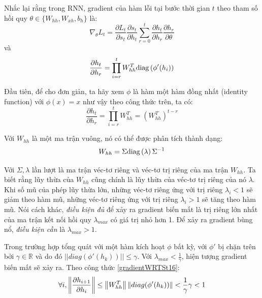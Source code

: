 Nhắc lại rằng trong RNN, gradient của hàm lỗi tại bước thời gian $t$ theo tham số hồi quy $\theta  \in \{W_{hh}, W_{xh}, b_h \}$ là:
\begin{equation} \label{beginGradientVanish0}
	\nabla_{\theta}L_t = \frac{\partial L_t}{\partial s_t} \frac{\partial s_t}{\partial h_t} \sum_{r=0}^{t}  \frac{\partial h_t}{\partial h_r}\frac{\partial h_r}{\partial \theta}
\end{equation}
và 
\begin{equation} \label{beginGradientVanish1}
	\frac{\partial h_t}{\partial h_r} = \prod_{i=r}^{t} W_{hh}^T \mathrm{diag} \left( \phi'(h_i) \right)
\end{equation}

Đầu tiên, để cho đơn giản, ta hãy xem $\phi$ là hàm một hàm đồng nhất (identity function) với $\phi(x) = x$ như vậy theo công thức trên, ta có:
\begin{equation} \label{gradientVanish3}
	\frac{\partial h_t}{\partial h_r} = \prod_{i=r}^{t} W_{hh}^T = \left (W_{hh}^T \right)^{t-r}
\end{equation}

Với $W_{hh}$ là một ma trận vuông, nó có thể được phân tích thành dạng:
\begin{equation} \label{gradientVanish4}
	W_{hh} = \Sigma \mathrm{diag} \left(\lambda \right) \Sigma^{-1} 
\end{equation}

Với $\Sigma, \lambda$ lần lượt là ma trận véc-tơ riêng và véc-tơ trị riêng của ma trận $W_{hh}$. Ta biết rằng lũy thừa của $W_{hh}$ cũng chính là lũy thừa của véc-tơ trị riêng của nó $\lambda$. Khi số mũ của phép lũy thừa lớn, những véc-tơ riêng ứng với trị riêng $\lambda_i < 1$ sẽ giảm theo hàm mũ, những véc-tơ riêng ứng với trị riêng $\lambda_i > 1$ sẽ tăng theo hàm mũ. Nói cách khác, \textit{điều kiện đủ} để xảy ra gradient biến mất là trị riêng lớn nhất của ma trận kết nối hồi quy $\lambda_{max}$ có giá trị nhỏ hơn 1. Để xảy ra gradient bùng nổ, \textit{điều kiện cần} là $\lambda_{max} > 1$.

Trong trường hợp tổng quát với một hàm kích hoạt $\phi$ bất kỳ, với $\phi'$ bị chặn trên bởi $\gamma \in \mathbb{R}$ và do đó $||diag(\phi'(h_k))|| \leq \gamma$. Với $\lambda_{max} < \frac{1}{\gamma}$, hiện tượng gradient biến mất sẽ xảy ra. Theo công thức \ref{gradientWRTSt16}:
\begin{equation} \label{gradientVanish5}
	\forall i, \left\lVert\frac{\partial h_{i+1}}{\partial h_{i}}\right\rVert \leq \left\lVert W^T_{hh} \right\rVert \left\lVert diag(\phi'(h_k)) \right\rVert < \frac{1}{\gamma} \gamma < 1 
\end{equation}

